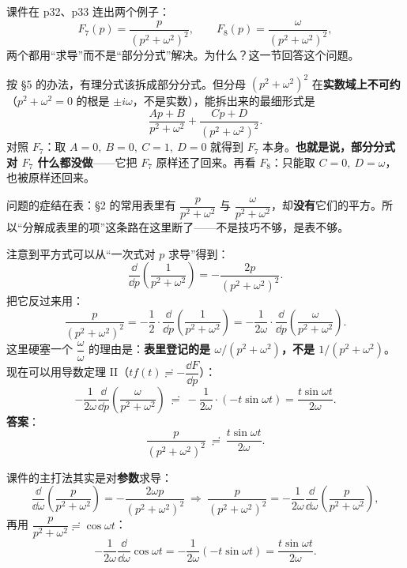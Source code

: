 \documentclass[11pt]{ctexart}
\begin{document}
课件在 p32、p33 连出两个例子：
\[ F_7(p)=\frac{p}{(p^{2}+\omega^{2})^{2}},\qquad F_8(p)=\frac{\omega}{(p^{2}+\omega^{2})^{2}} ,\]
两个都用“求导”而不是“部分分式”解决。为什么？这一节回答这个问题。


按 §5 的办法，有理分式该拆成部分分式。但分母 $(p^{2}+\omega^{2})^{2}$ 在\textbf{实数域上不可约}（$p^{2}+\omega^{2}=0$ 的根是 $\pm i\omega$，不是实数），能拆出来的最细形式是
\[ \frac{Ap+B}{p^{2}+\omega^{2}}+\frac{Cp+D}{(p^{2}+\omega^{2})^{2}} .\]
对照 $F_7$：取 $A=0,\ B=0,\ C=1,\ D=0$ 就得到 $F_7$ 本身。\textbf{也就是说，部分分式对 $F_7$ 什么都没做}——它把 $F_7$ 原样还了回来。再看 $F_8$：只能取 $C=0,\ D=\omega$，也被原样还回来。

问题的症结在表：§2 的常用表里有 $\dfrac{p}{p^{2}+\omega^{2}}$ 与 $\dfrac{\omega}{p^{2}+\omega^{2}}$，却\textbf{没有}它们的平方。所以“分解成表里的项”这条路在这里断了——不是技巧不够，是表不够。


注意到平方式可以从“一次式对 $p$ 求导”得到：
\[ \frac{\dd}{\dd p}\left(\frac{1}{p^{2}+\omega^{2}}\right)=-\frac{2p}{(p^{2}+\omega^{2})^{2}} .\]
把它反过来用：
\[
\frac{p}{(p^{2}+\omega^{2})^{2}}
=-\frac{1}{2}\cdot\frac{\dd}{\dd p}\left(\frac{1}{p^{2}+\omega^{2}}\right)
=-\frac{1}{2\omega}\cdot\frac{\dd}{\dd p}\left(\frac{\omega}{p^{2}+\omega^{2}}\right) .
\]
这里硬塞一个 $\dfrac{\omega}{\omega}$ 的理由是：\textbf{表里登记的是 $\omega/(p^{2}+\omega^{2})$，不是 $1/(p^{2}+\omega^{2})$}。现在可以用导数定理 II（$tf(t)\risingdotseq-\dfrac{\dd F}{\dd p}$）：
\[
-\frac{1}{2\omega}\frac{\dd}{\dd p}\left(\frac{\omega}{p^{2}+\omega^{2}}\right)
\ \risingdotseq\ -\frac{1}{2\omega}\cdot\left(-t\sin\omega t\right)
=\frac{t\sin\omega t}{2\omega} .
\]
\textbf{答案}：
\[ \frac{p}{(p^{2}+\omega^{2})^{2}}\ \risingdotseq\ \frac{t\sin\omega t}{2\omega} .\]


课件的主打法其实是对\textbf{参数}求导：
\[ \frac{\dd}{\dd\omega}\left(\frac{p}{p^{2}+\omega^{2}}\right)=-\frac{2\omega p}{(p^{2}+\omega^{2})^{2}}
\ \Longrightarrow\
\frac{p}{(p^{2}+\omega^{2})^{2}}=-\frac{1}{2\omega}\frac{\dd}{\dd\omega}\left(\frac{p}{p^{2}+\omega^{2}}\right) ,\]
再用 $\dfrac{p}{p^{2}+\omega^{2}}\risingdotseq\cos\omega t$：
\[ -\frac{1}{2\omega}\frac{\dd}{\dd\omega}\cos\omega t=-\frac{1}{2\omega}\left(-t\sin\omega t\right)=\frac{t\sin\omega t}{2\omega} .\]
\end{document}
